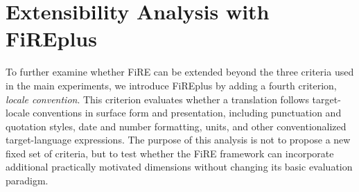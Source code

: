 \documentclass{article}
\theoremstyle{plain}
\theoremstyle{definition}
\theoremstyle{remark}
\newcommand{\enzh}{\textsc{en→zh} }
\begin{document}
\begin{table}[h!]
\centering
\caption{Percentage agreement (\%) with human annotations on \enzh ranked data under different strategies for aggregating FiRE predictions from the original and swapped candidate orders. Higher values indicate better alignment with human judgments. The table compares three families of aggregation strategies for mitigating position bias: (A) directly aggregating all six criterion-level judgments from both orders; (B) first reconciling the two orders at the criterion level, then aggregating to an overall decision; and (C) first producing one overall decision per order, then taking consensus between the two overall decisions. ``Original Aggregation of 3 Criteria'' denotes the aggregation method used in the main paper based on a single evaluation order. $^{*}$ uses criterion weights $(2/1.5/1/2/1.5/1)$ across the six judgments, and $^{\dagger}$ uses $(2/2/1/2/2/1)$.}
    \label{tab:aggregation_strategy}
\end{table}

\section{Extensibility Analysis with FiREplus}
\label{appx:fireplus}

To further examine whether FiRE can be extended beyond the three criteria used in the main experiments, we introduce FiREplus by adding a fourth criterion, \textit{locale convention}. This criterion evaluates whether a translation follows target-locale conventions in surface form and presentation, including punctuation and quotation styles, date and number formatting, units, and other conventionalized target-language expressions. The purpose of this analysis is not to propose a new fixed set of criteria, but to test whether the FiRE framework can incorporate additional practically motivated dimensions without changing its basic evaluation paradigm.
\end{document}
